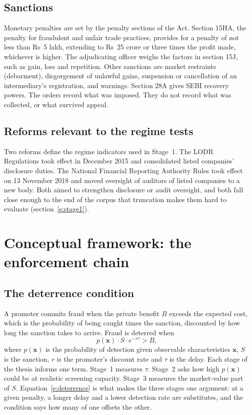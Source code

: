 \documentclass[letterpaper,11pt,leqno]{article}
\begin{document}
\subsection{Sanctions}

Monetary penalties are set by the penalty sections of the Act. Section 15HA, the penalty for fraudulent and unfair trade practices, provides for a penalty of not less than Rs~5 lakh, extending to Rs~25 crore or three times the profit made, whichever is higher. The adjudicating officer weighs the factors in section 15J, such as gain, loss and repetition. Other sanctions are market restraints (debarment), disgorgement of unlawful gains, suspension or cancellation of an intermediary's registration, and warnings. Section 28A gives SEBI recovery powers. The orders record what was imposed. They do not record what was collected, or what survived appeal.

\subsection{Reforms relevant to the regime tests}

Two reforms define the regime indicators used in Stage~1. The LODR Regulations took effect in December 2015 and consolidated listed companies' disclosure duties. The National Financial Reporting Authority Rules took effect on 13 November 2018 and moved oversight of auditors of listed companies to a new body. Both aimed to strengthen disclosure or audit oversight, and both fall close enough to the end of the corpus that truncation makes them hard to evaluate (section~\ref{s:stage1}).

\section{Conceptual framework: the enforcement chain}\label{s:framework}

\subsection{The deterrence condition}

A promoter commits fraud when the private benefit $B$ exceeds the expected cost, which is the probability of being caught times the sanction, discounted by how long the sanction takes to arrive. Fraud is deterred when
\begin{equation}
p(\bm{x}) \cdot S \cdot e^{-r\tau} > B,
\label{e:deterrence}\end{equation}
where $p(\bm{x})$ is the probability of detection given observable characteristics $\bm{x}$, $S$ is the sanction, $r$ is the promoter's discount rate and $\tau$ is the delay. Each stage of the thesis informs one term. Stage~1 measures $\tau$. Stage~2 asks how high $p(\bm{x})$ could be at realistic screening capacity. Stage~3 measures the market-value part of $S$. Equation~\eqref{e:deterrence} is what makes the three stages one argument: at a given penalty, a longer delay and a lower detection rate are substitutes, and the condition says how many of one offsets the other.
\end{document}
